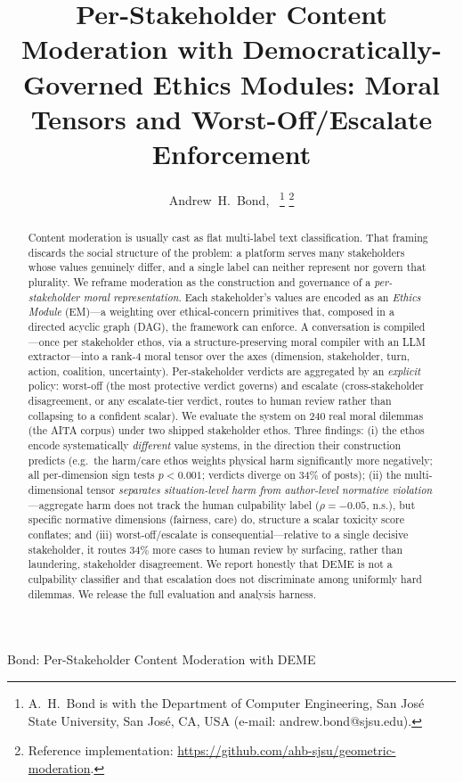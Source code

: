 \documentclass[journal]{IEEEtran}
\begin{document}
\title{Per-Stakeholder Content Moderation with Democratically-Governed
Ethics Modules: Moral Tensors and Worst-Off/Escalate Enforcement}

\author{Andrew~H.~Bond,~%
\thanks{A.~H.~Bond is with the Department of Computer Engineering,
San Jos\'e State University, San Jos\'e, CA, USA (e-mail: andrew.bond@sjsu.edu).}
\thanks{Reference implementation: \protect\url{https://github.com/ahb-sjsu/geometric-moderation}.}}

%
{Bond: Per-Stakeholder Content Moderation with DEME}

\maketitle

\begin{abstract}
Content moderation is usually cast as flat multi-label text classification.
That framing discards the social structure of the problem: a platform serves
many stakeholders whose values genuinely differ, and a single label can neither
represent nor govern that plurality. We reframe moderation as the construction
and governance of a \emph{per-stakeholder moral representation}. Each
stakeholder's values are encoded as an \emph{Ethics Module} (EM)---a weighting
over ethical-concern primitives that, composed in a directed acyclic graph
(DAG), the framework can enforce. A conversation is compiled---once per
stakeholder ethos, via a structure-preserving moral compiler with an LLM
extractor---into a rank-4 moral tensor over the axes (dimension, stakeholder,
turn, action, coalition, uncertainty). Per-stakeholder verdicts are aggregated
by an \emph{explicit} policy: worst-off (the most protective verdict governs)
and escalate (cross-stakeholder disagreement, or any escalate-tier verdict,
routes to human review rather than collapsing to a confident scalar). We
evaluate the system on 240 real moral dilemmas (the AITA corpus) under two
shipped stakeholder ethos. Three findings: (i) the ethos encode systematically
\emph{different} value systems, in the direction their construction predicts
(e.g.\ the harm/care ethos weights physical harm significantly more negatively;
all per-dimension sign tests $p<0.001$; verdicts diverge on 34\% of posts);
(ii) the multi-dimensional tensor \emph{separates situation-level harm from
author-level normative violation}---aggregate harm does not track the human
culpability label ($\rho{=}{-}0.05$, n.s.), but specific normative dimensions
(fairness, care) do, structure a scalar toxicity score conflates; and (iii)
worst-off/escalate is consequential---relative to a single decisive
stakeholder, it routes 34\% more cases to human review by surfacing, rather
than laundering, stakeholder disagreement. We report honestly that DEME is not
a culpability classifier and that escalation does not discriminate among
uniformly hard dilemmas. We release the full evaluation and analysis harness.
\end{abstract}
\end{document}
